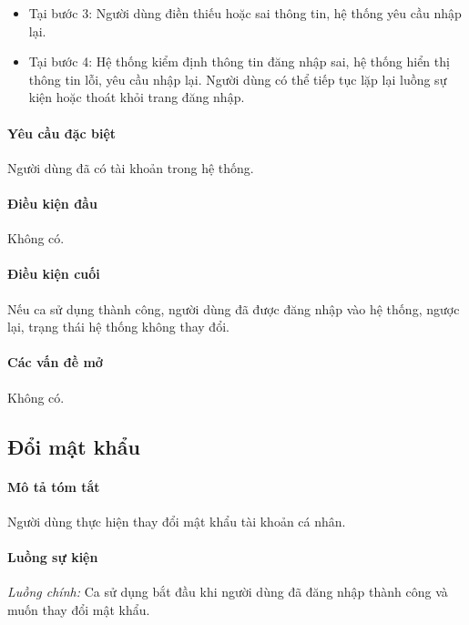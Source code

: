 \documentclass[./../main.tex]{subfiles}
\begin{document}
\begin{itemize}
	\item
	      	Tại bước 3: Người dùng điền thiếu hoặc sai thông tin, hệ thống yêu cầu
	      	nhập lại.
	\item
	      	Tại bước 4: Hệ thống kiểm định thông tin đăng nhập sai, hệ thống hiển
	      	thị thông tin lỗi, yêu cầu nhập lại. Người dùng có thể tiếp tục lặp
	      	lại luồng sự kiện hoặc thoát khỏi trang đăng nhập.
\end{itemize}

\paragraph*{Yêu cầu đặc biệt}

Người dùng đã có tài khoản trong hệ thống.

\paragraph*{Điều kiện đầu}

Không có.

\paragraph*{Điều kiện cuối}

Nếu ca sử dụng thành công, người dùng đã được đăng nhập vào hệ thống,
ngược lại, trạng thái hệ thống không thay đổi.

\paragraph*{Các vấn đề mở}

Không có.

\subsection{Đổi mật khẩu}

\paragraph*{Mô tả tóm tắt}

Người dùng thực hiện thay đổi mật khẩu tài khoản cá nhân.

\paragraph*{Luồng sự kiện}

\emph{Luồng chính:} Ca sử dụng bắt đầu khi người dùng đã đăng nhập thành
công và muốn thay đổi mật khẩu.
\end{document}
